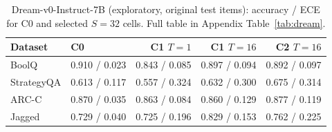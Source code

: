 \begin{table}[t]
\centering
\small
\caption{Dream-v0-Instruct-7B (exploratory, original test items): accuracy / ECE for C0 and selected $S{=}32$ cells. Full table in Appendix Table~\ref{tab:dream}.}
\label{tab:dream_compact}
\begin{tabular}{llrrr}
\toprule
Dataset & C0 & C1 $T{=}1$ & C1 $T{=}16$ & C2 $T{=}16$ \\
\midrule
BoolQ & 0.910 / 0.023 & 0.843 / 0.085 & 0.897 / 0.094 & 0.892 / 0.097 \\
StrategyQA & 0.613 / 0.117 & 0.557 / 0.324 & 0.632 / 0.300 & 0.675 / 0.314 \\
ARC-C & 0.870 / 0.035 & 0.863 / 0.084 & 0.860 / 0.129 & 0.877 / 0.119 \\
Jagged & 0.729 / 0.040 & 0.725 / 0.196 & 0.829 / 0.153 & 0.762 / 0.225 \\
\bottomrule
\end{tabular}
\end{table}
